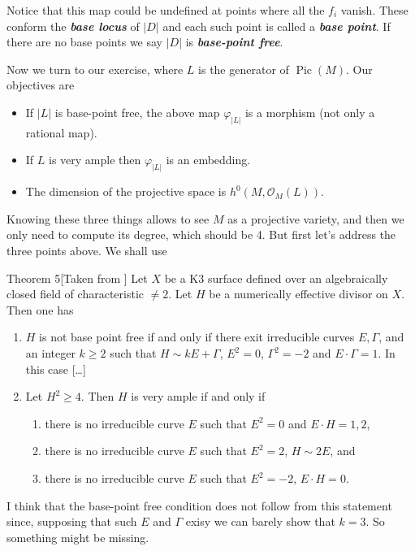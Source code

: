 Notice that this map could be undefined at points where all the $f_i$ vanish. These conform the \textit{\textbf{base locus}} of  $|D|$ and each such point is called a \textit{\textbf{base point}}. If there are no base points we say $|D|$ is \textit{\textbf{base-point free}}.

Now we turn to our exercise, where $L$ is the generator of $\operatorname{Pic}(M)$.  Our objectives are
	\begin{itemize}
	\item If $|L|$ is base-point free, the above map $\varphi_{|L|}$ is a morphism (not only a rational map).
	\item If $L$ is very ample then $\varphi_{|L|}$ is an embedding.
	\item The dimension of the projective space is $h^{0}(M,\mathcal{O}_M(L))$.
	\end{itemize}
Knowing these three things allows to see $M$ as a projective variety, and then we only need to compute its degree, which should be 4. But first let's address the three points above. We shall use

\begin{thing5}{Theorem 5}[Taken from \cite{mori}]\leavevmode
	Let $X$ be a K3 surface defined over an algebraically closed field of characteristic $\neq 2$. Let $H$ be a numerically effective divisor on $X$. Then one has
	\begin{enumerate}
		\item $H$ is not base point free if and only if there exit irreducible curves $E,\Gamma$, and an integer $k\geq 2$ such that $H\sim kE+\Gamma$, $E^2=0$, $\Gamma^2=-2$ and $E\cdot \Gamma=1$. In this case […]
		\item Let $H^2\geq 4$. Then $H$ is very ample if and only if
			\begin{enumerate}
				\item there is no irreducible curve $E$ such that $E^2=0$ and $E\cdot H=1,2$,
				\item there is no irreducible curve $E$ such that $E^2=2$, $H\sim 2E$, and
				\item there is no irreducible curve $E$ such that $E^2=-2$, $E\cdot H=0$.
			\end{enumerate}
	\end{enumerate}
\end{thing5}

I think that the base-point free condition does not follow from this statement since, supposing that such $E$ and  $ \Gamma$ exisy we can barely show that $k=3$. So something might be missing.

